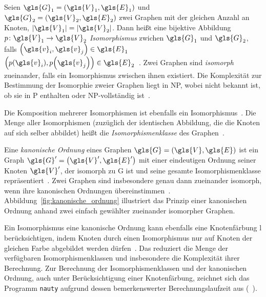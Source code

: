Seien $\gls{G}_1 = \left(\gls{V}_1, \gls{E}_1\right)$ und $\gls{G}_2 = \left(\gls{V}_2, \gls{E}_2\right)$ zwei Graphen mit der gleichen Anzahl an Knoten, \dhe{} $\left|\gls{V}_1\right| = \left|\gls{V}_2\right|$.
Dann heißt eine bijektive Abbildung $p \colon \gls{V}_1 \to \gls{V}_2$ \emph{Isomorphismus} zwichen $\gls{G}_1$ und $\gls{G}_2$, falls $\left(\gls{v}_i, \gls{v}_j\right) \in \gls{E}_1$ \gdw{} $\left(p\left(\gls{v}_i\right), p\left(\gls{v}_j\right)\right) \in \gls{E}_2$~\cite{nauty}.
Zwei Graphen sind \emph{isomorph} zueinander, falls ein Isomorphismus zwischen ihnen existiert.
Die Komplexität zur Bestimmung der Isomorphie zweier Graphen liegt in NP, wobei nicht bekannt ist, ob sie in P enthalten oder NP-vollständig ist~\cite{patchy}.

Die Komposition mehrerer Isomorphismen ist ebenfalls ein Isomorphismus~\cite{nauty}.
Die Menge aller Isomorphismen (zuzüglich der identischen Abbildung, die die Knoten auf sich selber abbildet) heißt die \emph{Isomorphismenklasse} des Graphen~\cite{nauty}.

Eine \emph{kanonische Ordnung} eines Graphen $\gls{G} = \left(\gls{V}, \gls{E}\right)$ ist ein Graph $\gls{G}^{\prime} = \left(\gls{V}^{\prime}, \gls{E}^{\prime}\right)$ mit einer eindeutigen Ordnung seiner Knoten $\gls{V}^{\prime}$, der isomorph zu \gls{G} ist und seine gesamte Isomorphismenklasse repräsentiert~\cite{patchy}.
Zwei Graphen sind insbesondere genau dann zueinander isomorph, wenn ihre kanonischen Ordnungen übereinstimmen~\cite{nauty}.
Abbildung~\ref{fig:kanonische_ordnung} illustriert das Prinzip einer kanonischen Ordnung anhand zwei einfach gewählter zueinander isomorpher Graphen.


Ein Isomorphismus \bzw{} eine kanonische Ordnung kann ebenfalls eine Knotenfärbung \gls{l} berücksichtigen, indem Knoten durch einen Isomorphismus nur auf Knoten der gleichen Farbe abgebildet werden dürfen~\cite{nauty}.
Das reduziert die Menge der verfügbaren Isomorphismenklassen und insbesondere die Komplexität ihrer Berechnung.
Zur Berechnung der Isomorphismenklassen und der kanonischen Ordnung, auch unter Berücksichtigung einer Knotenfärbung, zeichnet sich das Programm \texttt{nauty} aufgrund dessen bemerkenswerter Berechnungslaufzeit aus (\vgl{}~\cite{nauty}).
